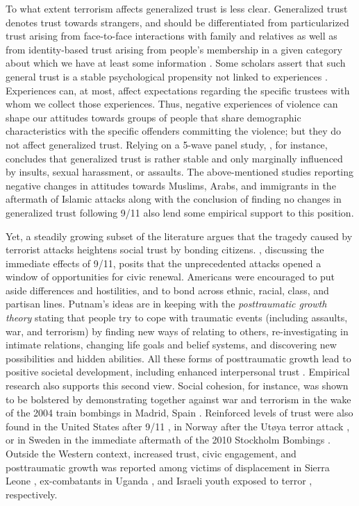 To what extent terrorism affects generalized trust is less clear. Generalized trust denotes trust towards strangers, and should be differentiated from particularized trust arising from face-to-face interactions with family and relatives \citep{Bjrnskov2006a} as well as from identity-based trust arising from people’s membership in a given category about which we have at least some information \citep[such as a religion or nationality;][]{Freitag2013a}. Some scholars assert that such general trust is a stable psychological propensity not linked to experiences \citep{Bjrnskov2006a, Jones1996, Uslaner2002, Uslaner2008}. Experiences can, at most, affect expectations regarding the specific trustees with whom we collect those experiences. Thus, negative experiences of violence can shape our attitudes towards groups of people that share demographic characteristics with the specific offenders committing the violence; but they do not affect generalized trust. Relying on a 5-wave panel study, \cite{Bauer2015}, for instance, concludes that generalized trust is rather stable and only marginally influenced by insults, sexual harassment, or assaults. The above-mentioned studies reporting negative changes in attitudes towards Muslims, Arabs, and immigrants in the aftermath of Islamic attacks along with the conclusion of \cite{Clark2013a} finding no changes in generalized trust following 9/11 also lend some empirical support to this position.


Yet, a steadily growing subset of the literature argues that the tragedy caused by terrorist attacks heightens social trust by bonding citizens. \cite{Putnam2002}, discussing the immediate effects of 9/11, posits that the unprecedented attacks opened a window of opportunities for civic renewal. Americans were encouraged to put aside differences and hostilities, and to bond across ethnic, racial, class, and partisan lines. Putnam’s ideas are in keeping with the \textit{posttraumatic growth theory} stating that people try to cope with traumatic events (including assaults, war, and terrorism) by finding new ways of relating to others, re-investigating in intimate relations, changing life goals and belief systems, and discovering new possibilities and hidden abilities. All these forms of posttraumatic growth lead to positive societal development, including enhanced interpersonal trust \citep{Calhoun2014, Laufer2006, Tedeschi1996}. Empirical research also supports this second view. Social cohesion, for instance, was shown to be bolstered by demonstrating together against war and terrorism in the wake of the 2004 train bombings in Madrid, Spain \citep{Paez2007}. Reinforced levels of trust were also found in the United States after 9/11 \citep{Butler2005, Milam2005}, in Norway after the Ut{\o}ya terror attack \citep{Wollebk2012}, or in Sweden in the immediate aftermath of the 2010 Stockholm Bombings \citep{Geys2017}. Outside the Western context, increased trust, civic engagement, and posttraumatic growth was reported among victims of displacement in Sierra Leone \citep{Bellows2009}, ex-combatants in Uganda \citep{Blattman2009}, and Israeli youth exposed to terror \citep{Laufer2006, Laufer2010a}, respectively.


